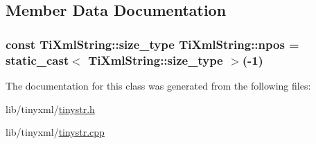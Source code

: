 \subsection{Member Data Documentation}
\hypertarget{class_ti_xml_string_a8f4422d227088dc7bec96f479b275d0a}{
\subsubsection[{npos}]{\setlength{\rightskip}{0pt plus 5cm}const {\bf Ti\-Xml\-String\-::size\-\_\-type} Ti\-Xml\-String\-::npos = static\-\_\-cast$<$ {\bf Ti\-Xml\-String\-::size\-\_\-type} $>$(-\/1)\hspace{0.3cm}{\ttfamily [static]}}}\label{class_ti_xml_string_a8f4422d227088dc7bec96f479b275d0a}


The documentation for this class was generated from the following files\-:\begin{DoxyCompactItemize}
\item 
lib/tinyxml/\hyperlink{tinystr_8h}{tinystr.\-h}\item 
lib/tinyxml/\hyperlink{tinystr_8cpp}{tinystr.\-cpp}\end{DoxyCompactItemize}
